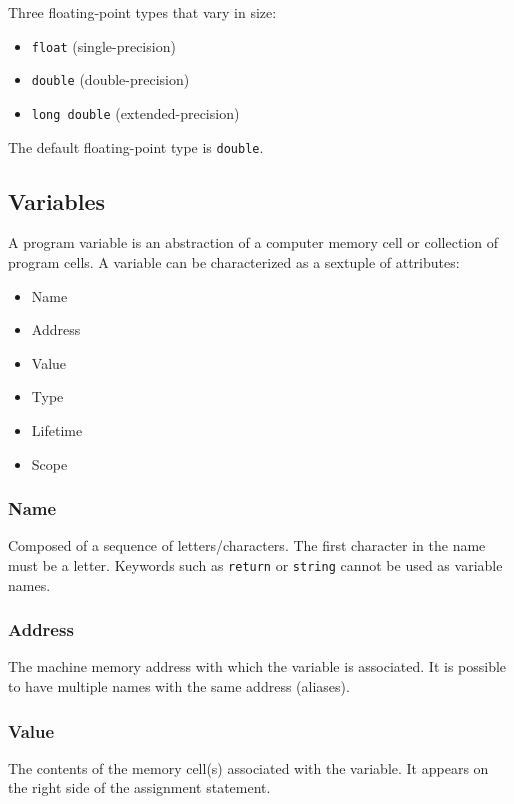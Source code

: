 \documentclass{article}
\begin{document}
	Three floating-point types that vary in size:
	\begin{itemize}
		\item \verb|float| (single-precision)
		\item \verb|double| (double-precision)
		\item \verb|long double| (extended-precision)
	\end{itemize}

	The default floating-point type is \verb|double|.
	
	\subsection{Variables}
	
	A program variable is an abstraction of a computer memory cell or collection of program cells. A variable can be characterized as a sextuple of attributes:
	\begin{itemize}
		\item Name
		\item Address
		\item Value
		\item Type
		\item Lifetime
		\item Scope
	\end{itemize}
	
	\subsubsection*{Name}
	
	Composed of a sequence of letters/characters. The first character in the name must be a letter. Keywords such as \verb|return| or \verb|string| cannot be used as variable names.
	
	\subsubsection*{Address}
	
	The machine memory address with which the variable is associated. It is possible to have multiple names with the same address (aliases).
	
	\subsubsection*{Value}
	
	The contents of the memory cell(s) associated with the variable. It appears on the right side of the assignment statement.
	
\end{document}
